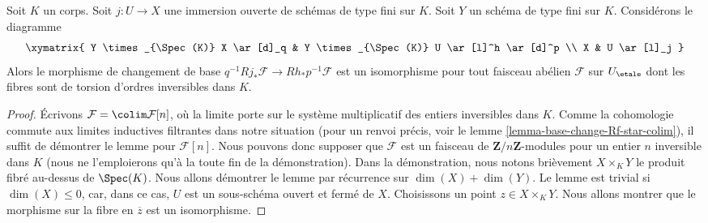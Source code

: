 \begin{lemma}
\label{lemma-kunneth-localize-on-X}
Soit $K$ un corps. Soit $j : U \to X$ une immersion ouverte de
schémas de type fini sur $K$. Soit $Y$ un schéma de type fini
sur $K$. Considérons le diagramme
$$
\xymatrix{
Y \times_{\Spec(K)} X \ar[d]_q  &
Y \times_{\Spec(K)} U \ar[l]^h \ar[d]^p \\
X & U \ar[l]_j
}
$$
Alors le morphisme de changement de base $q^{-1}Rj_*\mathcal{F} \to Rh_*p^{-1}\mathcal{F}$
est un isomorphisme pour tout faisceau abélien $\mathcal{F}$ sur $U_\etale$
dont les fibres sont de torsion d'ordres inversibles dans $K$.
\end{lemma}

\begin{proof}
Écrivons $\mathcal{F} = \colim \mathcal{F}[n]$, où la limite porte
sur le système multiplicatif des entiers inversibles dans $K$.
Comme la cohomologie commute aux limites inductives filtrantes dans notre situation
(pour un renvoi précis, voir le lemme \ref{lemma-base-change-Rf-star-colim}),
il suffit de démontrer le lemme pour $\mathcal{F}[n]$. Nous pouvons donc
supposer que $\mathcal{F}$ est un faisceau de $\mathbf{Z}/n\mathbf{Z}$-modules
pour un entier $n$ inversible dans $K$ (nous ne l'emploierons qu'à la toute fin de
la démonstration). Dans la démonstration, nous notons brièvement $X \times_K Y$ le produit
fibré au-dessus de $\Spec(K)$.
Nous allons démontrer le lemme par récurrence sur $\dim(X) + \dim(Y)$.
Le lemme est trivial si $\dim(X) \leq 0$, car, dans ce cas,
$U$ est un sous-schéma ouvert et fermé de $X$.
Choisissons un point $z \in X \times_K Y$. Nous allons montrer
que le morphisme sur la fibre en $\overline{z}$ est un isomorphisme.


\end{proof}
